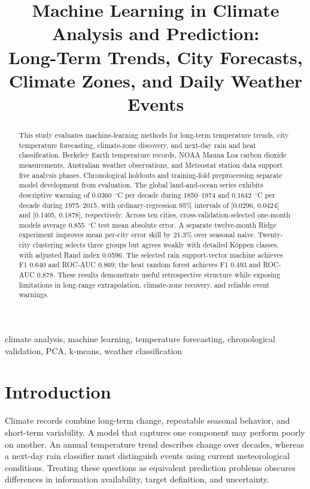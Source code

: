 \documentclass[conference]{IEEEtran}
\title{Machine Learning in Climate Analysis and Prediction:\\Long-Term Trends, City Forecasts, Climate Zones, and Daily Weather Events}
\author{\IEEEauthorblockN{Miguel A. De-Jesus-Rosa and Elias D Medina Galan}
\IEEEauthorblockA{Computer Engineering Department\\Universidad Ana G. M\'endez, Gurabo Campus\\Gurabo, Puerto Rico\\mde472@email.uagm.edu}}
\begin{document}
\maketitle
\begin{abstract}
This study evaluates machine-learning methods for long-term temperature trends, city temperature forecasting, climate-zone discovery, and next-day rain and heat classification. Berkeley Earth temperature records, NOAA Mauna Loa carbon dioxide measurements, Australian weather observations, and Meteostat station data support five analysis phases. Chronological holdouts and training-fold preprocessing separate model development from evaluation. The global land-and-ocean series exhibits descriptive warming of 0.0360~$^\circ$C per decade during 1850--1974 and 0.1642~$^\circ$C per decade during 1975--2015, with ordinary-regression 95\% intervals of [0.0296, 0.0424] and [0.1405, 0.1878], respectively. Across ten cities, cross-validation-selected one-month models average 0.855~$^\circ$C test mean absolute error. A separate twelve-month Ridge experiment improves mean per-city error skill by 21.3\% over seasonal naive. Twenty-city clustering selects three groups but agrees weakly with detailed K\"oppen classes, with adjusted Rand index 0.0596. The selected rain support-vector machine achieves F1 0.640 and ROC-AUC 0.869; the heat random forest achieves F1 0.493 and ROC-AUC 0.878. These results demonstrate useful retrospective structure while exposing limitations in long-range extrapolation, climate-zone recovery, and reliable event warnings.
\end{abstract}
\begin{IEEEkeywords}climate analysis, machine learning, temperature forecasting, chronological validation, PCA, k-means, weather classification\end{IEEEkeywords}

\section{Introduction}
Climate records combine long-term change, repeatable seasonal behavior, and short-term variability. A model that captures one component may perform poorly on another. An annual temperature trend describes change over decades, whereas a next-day rain classifier must distinguish events using current meteorological conditions. Treating these questions as equivalent prediction problems obscures differences in information availability, target definition, and uncertainty.
\end{document}

